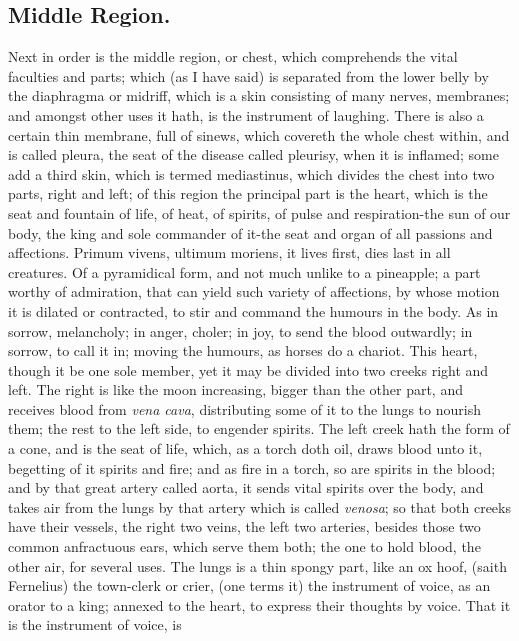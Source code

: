 {\subsection{Middle Region.}
Next in order is the middle region, or chest, which
comprehends the vital faculties and parts; which (as I have said) is
separated from the lower belly by the diaphragma or midriff, which is a
skin consisting of many nerves, membranes; and amongst other uses it
hath, is the instrument of laughing. There is also a certain thin
membrane, full of sinews, which covereth the whole chest within, and is
called pleura, the seat of the disease called pleurisy, when it is
inflamed; some add a third skin, which is termed mediastinus, which
divides the chest into two parts, right and left; of this region the
principal part is the heart, which is the seat and fountain of life, of
heat, of spirits, of pulse and respiration-the sun of our body, the
king and sole commander of it-the seat and organ of all passions and
affections. Primum vivens, ultimum moriens, it lives first, dies last
in all creatures. Of a pyramidical form, and not much unlike to a
pineapple; a part worthy of  admiration, that can yield such
variety of affections, by whose motion it is dilated or contracted, to
stir and command the humours in the body. As in sorrow, melancholy; in
anger, choler; in joy, to send the blood outwardly; in sorrow, to call
it in; moving the humours, as horses do a chariot. This heart, though
it be one sole member, yet it may be divided into two creeks right and
left. The right is like the moon increasing, bigger than the other
part, and receives blood from \emph{vena cava}, distributing some of it to
the lungs to nourish them; the rest to the left side, to engender
spirits. The left creek hath the form of a cone, and is the seat of
life, which, as a torch doth oil, draws blood unto it, begetting of it
spirits and fire; and as fire in a torch, so are spirits in the blood;
and by that great artery called aorta, it sends vital spirits over the
body, and takes air from the lungs by that artery which is called
\emph{venosa}; so that both creeks have their vessels, the right two veins,
the left two arteries, besides those two common anfractuous ears, which
serve them both; the one to hold blood, the other air, for several
uses. The lungs is a thin spongy part, like an ox hoof, (saith
Fernelius) the town-clerk or crier, (one terms it) the
instrument of voice, as an orator to a king; annexed to the heart, to
express their thoughts by voice. That it is the instrument of voice, is
}
